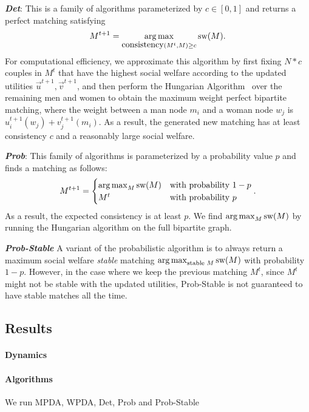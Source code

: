 \textit{\textbf{Det}}: This is a family of algorithms parameterized by $c \in [0, 1]$ and returns a perfect matching satisfying $$M^{t+1} = \operatorname*{arg\,max}_{\mbox{consistency}(M^t, M) \ge c}{\mbox{sw}(M)}.$$
For computational efficiency, we approximate this algorithm by first fixing $N * c$ couples in $M^t$ that have the highest social welfare according to the updated utilities $\overrightarrow{u}^{t+1}, \overrightarrow{v}^{t+1}$, and then perform the Hungarian Algorithm~\cite{Kuhn55thehungarian,Kuhn56thehungarian,Munkres1957Assignment} over the remaining men and women to obtain the maximum weight perfect bipartite matching, where the weight between a man node $m_i$ and a woman node $w_j$ is $u_i^{t+1}(w_j) + v_j^{t+1}(m_i)$. As a result, the generated new matching has at least consistency $c$ and a reasonably large social welfare.

\textit{\textbf{Prob}}: This family of algorithms is parameterized by a probability value $p$ and finds a matching as follows:
$$M^{t+1} = \begin{cases} \operatorname*{arg\,max}_M{\mbox{sw}(M)} &\text{with probability $1-p$}\\ M^t &\text{with probability $p$}\end{cases}.$$
As a result, the expected consistency is at least $p$. We find $\operatorname*{arg\,max}_M{\mbox{sw}(M)}$ by running the Hungarian algorithm on the full bipartite graph.

\textit{\textbf{Prob-Stable}} A variant of the probabilistic algorithm is to always return a maximum social welfare \textit{stable} matching $\operatorname*{arg\,max}_{\text{stable $M$}}{\mbox{sw}(M)}$ with probability $1-p$. However, in the case where we keep the previous matching $M^t$, since $M^t$ might not be stable with the updated utilities, Prob-Stable is not guaranteed to have stable matches all the time.


\subsection{Results}

\paragraph{Dynamics}


\paragraph{Algorithms} We run MPDA, WPDA, Det, Prob and Prob-Stable 

